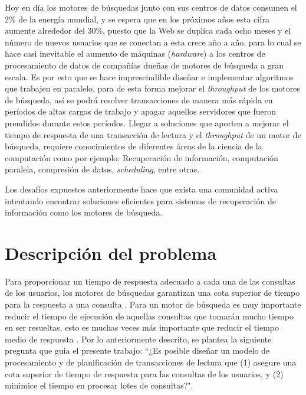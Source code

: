 Hoy en día los motores de búsquedas junto con sus centros de datos consumen el 2\% de la energía mundial, y se espera que en los próximos años esta cifra aumente alrededor del 30\%, puesto que la Web se duplica cada ocho meses y el número de nuevos usuarios que se conectan a esta crece año a año, para lo cual se hace casi inevitable el aumento de máquinas (\textit{hardware}) a los centros de procesamiento de datos de compañías dueñas de motores de búsqueda a gran escala. Es por esto que se hace imprescindible diseñar e implementar algoritmos que trabajen en paralelo, para de esta forma mejorar el \textit{throughput} de los motores de búsqueda, así se podrá resolver transacciones de manera más rápida en períodos de altas cargas de trabajo y apagar aquellos servidores que fueron prendidos durante estos períodos. Llegar a soluciones que aporten a mejorar el tiempo de respuesta de una transacción de lectura y el \textit{throughput} de un motor de búsqueda, requiere conocimientos de diferentes áreas de la ciencia de la computación como por ejemplo: Recuperación de información, computación paralela, compresión de datos, \textit{scheduling}, entre otras. 

Los desafíos expuestos anteriormente hace que exista una comunidad activa intentando encontrar soluciones eficientes para sistemas de recuperación de información como los motores de búsqueda.  


\section{Descripci\'on del problema}
\label{intro:problema}
Para proporcionar un tiempo de respuesta adecuado a cada una de las consultas de los usuarios, los motores de búsquedas garantizan una cota superior de tiempo para la respuesta a una consulta \citep{Jeon:2014}. Para un motor de búsqueda es muy importante reducir el tiempo de ejecución de aquellas consultas que tomarán mucho tiempo en ser resueltas, esto es muchas veces más importante que reducir el tiempo medio de respuesta \citep{Dean:2013}. Por lo anteriormente descrito, se plantea la siguiente pregunta que guia el presente trabajo: ``¿Es posible diseñar un modelo de procesamiento y de planificación de transacciones de lectura que (1) asegure una cota superior de tiempo de respuesta para las consultas de los usuarios, y (2) minimice el tiempo en procesar lotes de consultas?".  


